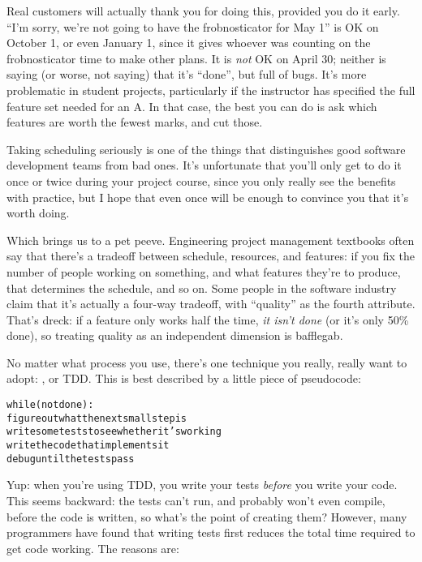 \documentclass{report}
\begin{document}
Real customers will actually thank you for doing this, provided you do
it early.  ``I'm sorry, we're not going to have the frobnosticator for
May 1'' is OK on October 1, or even January 1, since it gives whoever
was counting on the frobnosticator time to make other plans.  It is
\emph{not} OK on April 30; neither is saying (or worse, not saying)
that it's ``done'', but full of bugs.  It's more problematic in
student projects, particularly if the instructor has specified the
full feature set needed for an A.  In that case, the best you can do
is ask which features are worth the fewest marks, and cut those.

Taking scheduling seriously is one of the things that distinguishes
good software development teams from bad ones.  It's unfortunate that
you'll only get to do it once or twice during your project course,
since you only really see the benefits with practice, but I hope that
even once will be enough to convince you that it's worth doing.

Which brings us to a pet peeve.  Engineering project management
textbooks often say that there's a tradeoff between schedule,
resources, and features: if you fix the number of people working on
something, and what features they're to produce, that determines the
schedule, and so on.  Some people in the software industry claim that
it's actually a four-way tradeoff, with ``quality'' as the fourth
attribute.  That's dreck: if a feature only works half the time,
\emph{it isn't done} (or it's only 50\% done), so treating quality as
an independent dimension is bafflegab.


No matter what process you use, there's one technique you really,
really want to adopt: , or TDD.  This
is best described by a little piece of pseudocode:

\begin{alltt}
while (not done):
    figure out what the next small step is
    write some tests to see whether it's working
    write the code that implements it
    debug until the tests pass
\end{alltt}

Yup: when you're using TDD, you write your tests \emph{before} you
write your code.  This seems backward: the tests can't run, and
probably won't even compile, before the code is written, so what's the
point of creating them?  However, many programmers have found that
writing tests first reduces the total time required to get code
working.  The reasons are:
\end{document}
